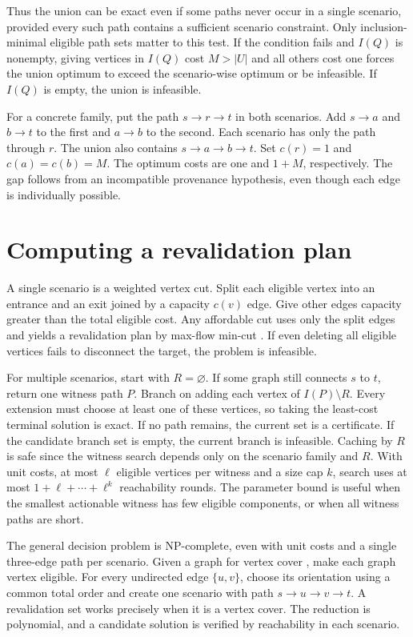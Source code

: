 \documentclass[11pt]{article}
\begin{document}
Thus the union can be exact even if some paths never occur in a
single scenario, provided every such path contains a sufficient
scenario constraint. Only inclusion-minimal eligible path sets
matter to this test. If the condition fails and $I(Q)$ is nonempty,
giving vertices in $I(Q)$ cost $M>|U|$ and all others cost one
forces the union optimum to exceed the scenario-wise optimum or
be infeasible. If $I(Q)$ is empty, the union is infeasible.

For a concrete family, put the path $s\to r\to t$ in both
scenarios. Add $s\to a$ and $b\to t$ to the first and $a\to b$
to the second. Each scenario has only the path through $r$.
The union also contains $s\to a\to b\to t$. Set $c(r)=1$
and $c(a)=c(b)=M$. The optimum costs are one and $1+M$,
respectively. The gap follows from an incompatible provenance
hypothesis, even though each edge is individually possible.

\section{Computing a revalidation plan}
A single scenario is a weighted vertex cut. Split each eligible
vertex into an entrance and an exit joined by a capacity $c(v)$
edge. Give other edges capacity greater than the total eligible
cost. Any affordable cut uses only the split edges and yields
a revalidation plan by max-flow min-cut \cite{ford}.
If even deleting all eligible vertices fails to disconnect the
target, the problem is infeasible.

For multiple scenarios, start with $R=\varnothing$. If some
graph still connects $s$ to $t$, return one witness path $P$.
Branch on adding each vertex of $I(P)\setminus R$. Every
extension must choose at least one of these vertices, so taking
the least-cost terminal solution is exact. If no path remains,
the current set is a certificate. If the candidate branch set
is empty, the current branch is infeasible. Caching by $R$ is
safe since the witness search depends only on the scenario
family and $R$. With unit costs, at most $\ell$ eligible
vertices per witness and a size cap $k$, search uses at most
$1+\ell+\cdots+\ell^k$ reachability rounds. The parameter bound
is useful when the smallest actionable witness has few eligible
components, or when all witness paths are short.

The general decision problem is NP-complete, even with unit
costs and a single three-edge path per scenario. Given a graph
for vertex cover \cite{karp}, make each graph vertex eligible.
For every undirected edge $\{u,v\}$, choose its orientation
using a common total order and create one scenario with path
$s\to u\to v\to t$. A revalidation set works precisely when
it is a vertex cover. The reduction is polynomial, and a
candidate solution is verified by reachability in each scenario.
\end{document}
